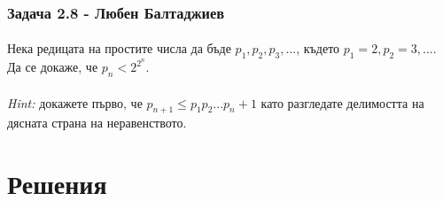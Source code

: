 \documentclass[12pt]{article}
\begin{document}
\subsubsection*{Задача 2.8 - Любен Балтаджиев}
\paragraph*{}
Нека редицата на простите числа да бъде $p_1, p_2, p_3, ...$, където $p_1 = 2, p_2 = 3, ...$. Да се докаже, че $p_n < 2^{2^n}$.
\paragraph*{}
\emph{Hint: }докажете първо, че $p_{n+1} \leq p_1 p_2 ... p_n + 1$ като разгледате делимостта на дясната страна на неравенството.

\section*{Решения}
\end{document}
